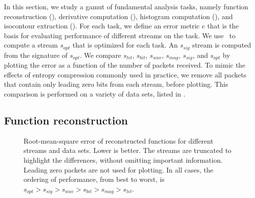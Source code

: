 In this section, we study a gamut of fundamental analysis tasks, namely function reconstruction
(), derivative computation (),
histogram computation (), and isocontour extraction
(). For each task, we define an error metric $e$ that is the basis for
evaluating performance of different streams on the task. We use~ to
compute a stream $s_{opt}$ that is optimized for each task. An $s_{sig}$ stream is computed from the
signature of $s_{opt}$. We compare $s_{lvl}$, $s_{bit}$, $s_{wav}$, $s_{mag}$, $s_{sig}$, and
$s_{opt}$ by plotting the error as a function of the number of packets received. To mimic the
effects of entropy compression commonly used in practice, we remove all packets that contain only
leading zero bits from each stream, before plotting. This comparison is performed on a variety of
data sets, listed in . 

\subsection{Function reconstruction}\label{sec:rmse-optimized}

\begin{figure}[t]
  \centering
		\caption{Root-mean-square error of reconstructed functions for different streams and data sets.
		Lower is better. The streams are truncated to highlight the differences, without omitting
		important information. Leading zero packets are not used for plotting. In all cases, the
		ordering of performance, from best to worst, is $s_{opt} > s_{sig} > s_{wav} > s_{bit} > s_{mag}
		> s_{lvl}$.}\label{fig:rmse-optimized}
\end{figure}

